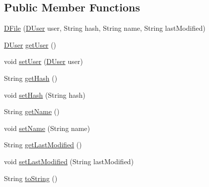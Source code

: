 \subsection*{Public Member Functions}
\begin{DoxyCompactItemize}
\item 
\mbox{\hyperlink{classes_1_1deusto_1_1bspq18_1_1e6_1_1_deusto_box_1_1_server_1_1jdo_1_1data_1_1_d_file_ac9b86d45be0665de4b997df30759257f}{D\+File}} (\mbox{\hyperlink{classes_1_1deusto_1_1bspq18_1_1e6_1_1_deusto_box_1_1_server_1_1jdo_1_1data_1_1_d_user}{D\+User}} user, String hash, String name, String last\+Modified)
\item 
\mbox{\hyperlink{classes_1_1deusto_1_1bspq18_1_1e6_1_1_deusto_box_1_1_server_1_1jdo_1_1data_1_1_d_user}{D\+User}} \mbox{\hyperlink{classes_1_1deusto_1_1bspq18_1_1e6_1_1_deusto_box_1_1_server_1_1jdo_1_1data_1_1_d_file_a9d15569149f23c452d1f63c654bdd232}{get\+User}} ()
\item 
void \mbox{\hyperlink{classes_1_1deusto_1_1bspq18_1_1e6_1_1_deusto_box_1_1_server_1_1jdo_1_1data_1_1_d_file_a39336971b4a385251b9d846a38a22be9}{set\+User}} (\mbox{\hyperlink{classes_1_1deusto_1_1bspq18_1_1e6_1_1_deusto_box_1_1_server_1_1jdo_1_1data_1_1_d_user}{D\+User}} user)
\item 
String \mbox{\hyperlink{classes_1_1deusto_1_1bspq18_1_1e6_1_1_deusto_box_1_1_server_1_1jdo_1_1data_1_1_d_file_adeee5b2b4f4f0449b27d7b1a0509d849}{get\+Hash}} ()
\item 
void \mbox{\hyperlink{classes_1_1deusto_1_1bspq18_1_1e6_1_1_deusto_box_1_1_server_1_1jdo_1_1data_1_1_d_file_ac0898aba01cdd5ef7176f9d76eba17e6}{set\+Hash}} (String hash)
\item 
String \mbox{\hyperlink{classes_1_1deusto_1_1bspq18_1_1e6_1_1_deusto_box_1_1_server_1_1jdo_1_1data_1_1_d_file_a017b4d464648f9680c6885cb7ca32f67}{get\+Name}} ()
\item 
void \mbox{\hyperlink{classes_1_1deusto_1_1bspq18_1_1e6_1_1_deusto_box_1_1_server_1_1jdo_1_1data_1_1_d_file_a47d272f8e391bfe80b61dd7c7ce1b369}{set\+Name}} (String name)
\item 
String \mbox{\hyperlink{classes_1_1deusto_1_1bspq18_1_1e6_1_1_deusto_box_1_1_server_1_1jdo_1_1data_1_1_d_file_ab9fad4c950800f527a544b5eecdceed5}{get\+Last\+Modified}} ()
\item 
void \mbox{\hyperlink{classes_1_1deusto_1_1bspq18_1_1e6_1_1_deusto_box_1_1_server_1_1jdo_1_1data_1_1_d_file_aa71373e84092ae2eed8da3feb408b2dd}{set\+Last\+Modified}} (String last\+Modified)
\item 
String \mbox{\hyperlink{classes_1_1deusto_1_1bspq18_1_1e6_1_1_deusto_box_1_1_server_1_1jdo_1_1data_1_1_d_file_a7dcad990a536e6604a342801d16aa4d3}{to\+String}} ()
\end{DoxyCompactItemize}


